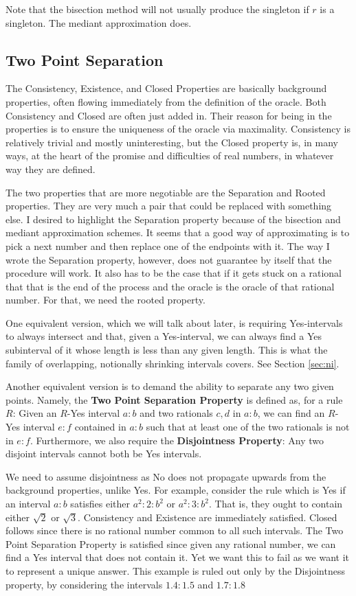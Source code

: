 \documentclass[12pt]{article}
\begin{document}
Note that the bisection method will not usually produce the singleton if $r$ is a singleton. The mediant approximation does. 

\subsection{Two Point Separation}

The Consistency, Existence, and Closed Properties are basically background properties, often flowing immediately from the definition of the oracle. Both Consistency and Closed are often just added in. Their reason for being in the properties is to ensure the uniqueness of the oracle via maximality. Consistency is relatively trivial and mostly uninteresting, but the Closed property is, in many ways, at the heart of the promise and difficulties of real numbers, in whatever way they are defined. 

The two properties that are more negotiable are the Separation and Rooted properties. They are very much a pair that could be replaced with something else. I desired to highlight the Separation property because of the bisection and mediant approximation schemes. It seems that a good way of approximating is to pick a next number and then replace one of the endpoints with it. The way I wrote the Separation property, however, does not guarantee by itself that the procedure will work. It also has to be the case that if it gets stuck on a rational that that is the end of the process and the oracle is the oracle of that rational number. For that, we need the rooted property. 

One equivalent version, which we will talk about later, is requiring Yes-intervals to always intersect and that, given a Yes-interval, we can always find a Yes subinterval of it whose length is less than any given length. This is what the family of overlapping, notionally shrinking intervals covers. See Section \ref{sec:ni}.

Another equivalent version is to demand the ability to separate any two given points. Namely, the \textbf{Two Point Separation Property} is defined as, for a rule $R$: Given an $R$-Yes interval $a:b$ and two rationals $c,d$ in $a:b$, we can find an $R$-Yes interval $e:f$ contained in $a:b$ such that at least one of the two rationals is not in $e:f$. Furthermore, we also require the \textbf{Disjointness Property}: Any two disjoint intervals cannot both be Yes intervals. 

We need to assume disjointness as No does not propagate upwards from the background properties, unlike Yes. For example, consider the rule which is Yes if an interval $a:b$ satisfies either $a^2:2:b^2$ or $a^2:3:b^2$. That is, they ought to contain either $\sqrt{2}$ or $\sqrt{3}$. Consistency and Existence are immediately satisfied. Closed follows since there is no rational number common to all such intervals. The Two Point Separation Property is satisfied since given any rational number, we can find a Yes interval that does not contain it. Yet we want this to fail as we want it to represent a unique answer. This example is ruled out only by the Disjointness property, by considering the intervals $1.4:1.5$ and $1.7:1.8$
\end{document}
